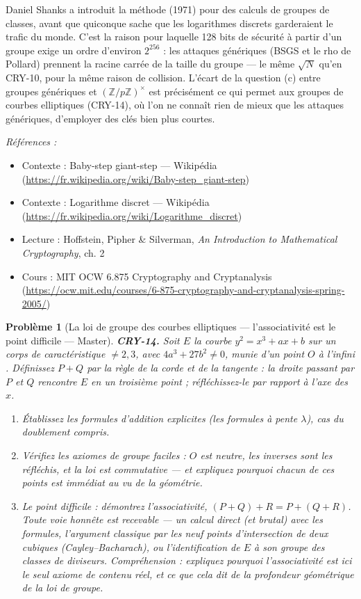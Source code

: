\documentclass[11pt]{article}
\newtheorem{problem}{Problème}
\newenvironment{refs}{\par\small\noindent\emph{Références :}\begin{itemize}\setlength\itemsep{0pt}}{\end{itemize}\normalsize}
\begin{document}
\noindent Daniel Shanks a introduit la méthode (1971) pour des calculs de groupes de
classes, avant que quiconque sache que les logarithmes discrets garderaient le trafic du
monde. C'est la raison pour laquelle \og{} 128 bits de sécurité \fg{} à partir d'un groupe exige un
ordre d'environ $2^{256}$ : les attaques génériques (BSGS et le rho de Pollard) prennent la
racine carrée de la taille du groupe --- le même $\sqrt N$ qu'en CRY-10, pour la même raison
de collision. L'écart de la question (c) entre groupes génériques et
$(\mathbb{Z}/p\mathbb{Z})^\times$ est précisément ce qui permet aux groupes de courbes
elliptiques (CRY-14), où l'on ne connaît rien de mieux que les attaques génériques, d'employer
des clés bien plus courtes.

\begin{refs}
\item Contexte : Baby-step giant-step --- Wikipédia (\url{https://fr.wikipedia.org/wiki/Baby-step_giant-step})
\item Contexte : Logarithme discret --- Wikipédia (\url{https://fr.wikipedia.org/wiki/Logarithme_discret})
\item Lecture : Hoffstein, Pipher \& Silverman, \textit{An Introduction to Mathematical Cryptography}, ch. 2
\item Cours : MIT OCW 6.875 Cryptography and Cryptanalysis (\url{https://ocw.mit.edu/courses/6-875-cryptography-and-cryptanalysis-spring-2005/})
\end{refs}

\bigskip

\begin{problem}[{La loi de groupe des courbes elliptiques --- l'associativité est le point difficile --- Master}]
\textbf{CRY-14.} Soit $E$ la courbe $y^2 = x^3 + ax + b$
sur un corps de caractéristique $\ne 2, 3$, avec $4a^3 + 27b^2 \ne 0$, munie
d'un point $O$ \og{} à l'infini \fg{}. Définissez $P+Q$ par la règle de la corde et de la
tangente : la droite passant par $P$ et $Q$ rencontre $E$ en un troisième point ;
réfléchissez-le par rapport à l'axe des $x$.
\begin{enumerate}
\item[(a)] Établissez les formules d'addition explicites (les formules
à pente $\lambda$), cas du doublement compris.
\item[(b)] Vérifiez les axiomes de groupe faciles : $O$ est
neutre, les inverses sont les réfléchis, et la loi est commutative --- et expliquez
\textit{pourquoi} chacun de ces points est immédiat au vu de la géométrie.
\item[(c)] Le point difficile : démontrez
l'associativité, $(P+Q)+R = P+(Q+R)$. Toute voie honnête est recevable --- un calcul direct
(et brutal) avec les formules, l'argument classique par les neuf points d'intersection de
deux cubiques (Cayley--Bacharach), ou l'identification de $E$ à son groupe des classes de
diviseurs. Compréhension : expliquez pourquoi l'associativité est ici le seul axiome de
contenu réel, et ce que cela dit de la profondeur géométrique de la loi de groupe.
\end{enumerate}

\end{problem}
\end{document}
